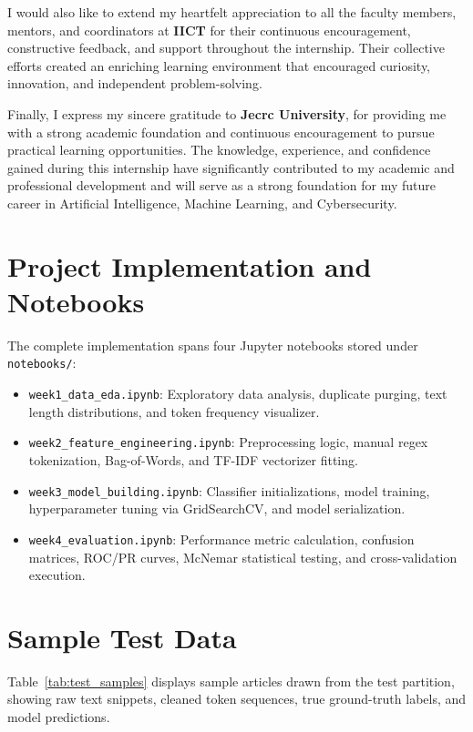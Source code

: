 \documentclass[conference]{IEEEtran}
\begin{document}
I would also like to extend my heartfelt appreciation to all the faculty members, mentors, and coordinators at \textbf{IICT} for their continuous encouragement, constructive feedback, and support throughout the internship. Their collective efforts created an enriching learning environment that encouraged curiosity, innovation, and independent problem-solving.

Finally, I express my sincere gratitude to \textbf{Jecrc University}, for providing me with a strong academic foundation and continuous encouragement to pursue practical learning opportunities. The knowledge, experience, and confidence gained during this internship have significantly contributed to my academic and professional development and will serve as a strong foundation for my future career in Artificial Intelligence, Machine Learning, and Cybersecurity.

\appendices

\section{Project Implementation and Notebooks}
The complete implementation spans four Jupyter notebooks stored under \texttt{notebooks/}:
\begin{itemize}
    \item \texttt{week1\_data\_eda.ipynb}: Exploratory data analysis, duplicate purging, text length distributions, and token frequency visualizer.
    \item \texttt{week2\_feature\_engineering.ipynb}: Preprocessing logic, manual regex tokenization, Bag-of-Words, and TF-IDF vectorizer fitting.
    \item \texttt{week3\_model\_building.ipynb}: Classifier initializations, model training, hyperparameter tuning via GridSearchCV, and model serialization.
    \item \texttt{week4\_evaluation.ipynb}: Performance metric calculation, confusion matrices, ROC/PR curves, McNemar statistical testing, and cross-validation execution.
\end{itemize}

\section{Sample Test Data}
Table~\ref{tab:test_samples} displays sample articles drawn from the test partition, showing raw text snippets, cleaned token sequences, true ground-truth labels, and model predictions.
\end{document}
